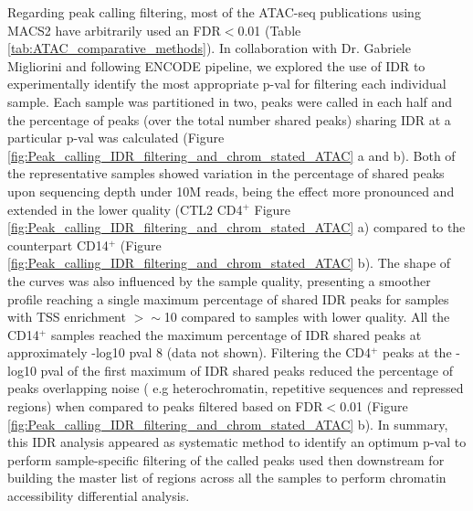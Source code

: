 Regarding peak calling filtering, most of the ATAC-seq publications using MACS2 have arbitrarily used an FDR$<$0.01 (Table \ref{tab:ATAC_comparative_methods}). In collaboration with Dr. Gabriele Migliorini and following ENCODE pipeline, we explored the use of IDR to experimentally identify the most appropriate p-val for filtering each individual sample. Each sample was partitioned in two, peaks were called in each half and the percentage of peaks (over the total number shared peaks) sharing IDR at a particular p-val was calculated (Figure \ref{fig:Peak_calling_IDR_filtering_and_chrom_stated_ATAC} a and b). Both of the representative samples showed variation in the percentage of shared peaks upon sequencing depth under 10M reads, being the effect more pronounced and extended in the lower quality (CTL2 CD4$^+$ Figure \ref{fig:Peak_calling_IDR_filtering_and_chrom_stated_ATAC} a) compared to the counterpart CD14$^+$ (Figure \ref{fig:Peak_calling_IDR_filtering_and_chrom_stated_ATAC} b). The shape of the curves was also influenced by the sample quality, presenting a smoother profile reaching a single maximum percentage of shared IDR peaks for samples with TSS enrichment $>\sim$10 compared to samples with lower quality. All the CD14$^+$ samples reached the maximum percentage of IDR shared peaks at approximately -log10 pval 8 (data not shown). 
Filtering the CD4$^+$ peaks at the -log10 pval of the first maximum of IDR shared peaks reduced the percentage of peaks overlapping noise ( e.g heterochromatin, repetitive sequences and repressed regions) when compared to peaks filtered based on FDR$<$0.01 (Figure \ref{fig:Peak_calling_IDR_filtering_and_chrom_stated_ATAC} b). In summary, this IDR analysis appeared as systematic method to identify an optimum p-val to perform sample-specific filtering of the called peaks used then downstream for building the master list of regions across all the samples to perform chromatin accessibility differential analysis. 




